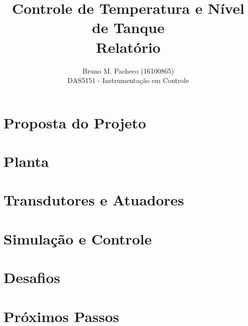 \documentclass[a4paper]{report}
\begin{document}
 
\title{Controle de Temperatura e Nível de Tanque\\Relatório}
\author{Bruno M. Pacheco (16100865) \\
DAS5151 - Instrumentação em Controle}
 
\maketitle

\section{Proposta do Projeto}

\section{Planta}

\section{Transdutores e Atuadores}

\section{Simulação e Controle}

\section{Desafios}

\section{Próximos Passos}
\end{document}
